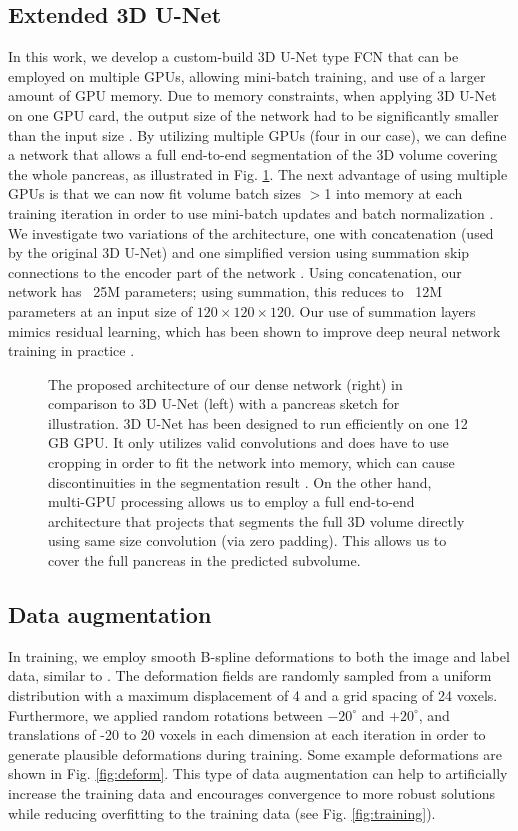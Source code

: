 \documentclass[a4paper]{spie}  %
\begin{document}
\subsection{Extended 3D U-Net} In this work, we develop a custom-build 3D U-Net type FCN that can be employed on multiple GPUs, allowing mini-batch training, and use of a larger amount of GPU memory. Due to memory constraints, when applying 3D U-Net on one GPU card, the output size of the network had to be significantly smaller than the input size \cite{cciccek20163d}. By utilizing multiple GPUs (four in our case), we can define a network that allows a full end-to-end segmentation of the 3D volume covering the whole pancreas, as illustrated in Fig. \ref{fig:network_proposal}. The next advantage of using multiple GPUs is that we can now fit volume batch sizes $>$1 into memory at each training iteration in order to use mini-batch updates and batch normalization \cite{ioffe2015batch}. We investigate two variations of the architecture, one with concatenation (used by the original 3D U-Net) and one simplified version using summation skip connections to the encoder part of the network \cite{drozdzal2016importance}. Using concatenation, our network has ~25M parameters; using summation, this reduces to ~12M parameters at an input size of $120\times120\times120$. Our use of summation layers mimics residual learning, which has been shown to improve deep neural network training in practice \cite{he2016deep}.
\begin{figure}[tb]
  \centering
\caption{ The proposed architecture of our dense network (right) in comparison to 3D U-Net\cite{cciccek20163d} (left) with a pancreas sketch for illustration. 3D U-Net has been designed to run efficiently on one 12 GB GPU. It only utilizes valid convolutions and does have to use cropping in order to fit the network into memory, which can cause discontinuities in the segmentation result \cite{roth2017hierarchical}. On the other hand, multi-GPU processing allows us to employ a full end-to-end architecture that projects that segments the full 3D volume directly using same size convolution (via zero padding). This allows us to cover the full pancreas in the predicted subvolume. \label{fig:network_proposal}}
\end{figure}
\subsection{Data augmentation} In training, we employ smooth B-spline deformations to both the image and label data, similar to \cite{cciccek20163d}. The deformation fields are randomly sampled from a uniform distribution with a maximum displacement of 4 and a grid spacing of 24 voxels. Furthermore, we applied random rotations between $-20^{\circ}$ and $+20^{\circ}$, and translations of -20 to 20 voxels in each dimension at each iteration in order to generate plausible deformations during training. Some example deformations are shown in Fig. \ref{fig:deform}. This type of data augmentation can help to artificially increase the training data and encourages convergence to more robust solutions while reducing overfitting to the training data (see Fig. \ref{fig:training}).
\end{document}
